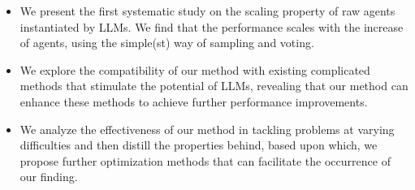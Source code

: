 \begin{itemize}
\item We present the first systematic study on the scaling property of raw agents instantiated by LLMs. We find that the performance scales with the increase of agents, using the simple(st) way of sampling and voting.  
\item We explore the compatibility of our method with existing complicated methods that stimulate the potential of LLMs, revealing that our method can enhance these methods to achieve further performance improvements.
\item We analyze the effectiveness of our method in tackling problems at varying difficulties and then distill the properties behind, based upon which, we propose further optimization methods that can facilitate the occurrence of our finding. 
\end{itemize}